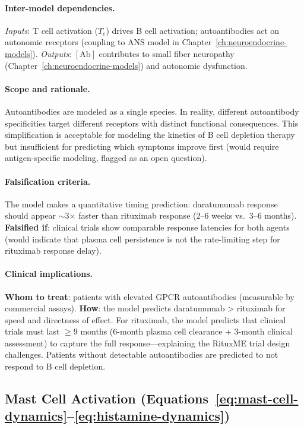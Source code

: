 \paragraph{Inter-model dependencies.}
\emph{Inputs}: T cell activation ($T_e$) drives B cell activation; autoantibodies act on autonomic receptors (coupling to ANS model in Chapter~\ref{ch:neuroendocrine-models}). \emph{Outputs}: $[\text{Ab}]$ contributes to small fiber neuropathy (Chapter~\ref{ch:neuroendocrine-models}) and autonomic dysfunction.

\paragraph{Scope and rationale.}
Autoantibodies are modeled as a single species. In reality, different autoantibody specificities target different receptors with distinct functional consequences. This simplification is acceptable for modeling the kinetics of B cell depletion therapy but insufficient for predicting which symptoms improve first (would require antigen-specific modeling, flagged as an open question).

\paragraph{Falsification criteria.}
The model makes a quantitative timing prediction: daratumumab response should appear $\sim$3$\times$ faster than rituximab response (2--6 weeks vs.\ 3--6 months). \textbf{Falsified if}: clinical trials show comparable response latencies for both agents (would indicate that plasma cell persistence is not the rate-limiting step for rituximab response delay).

\paragraph{Clinical implications.}
\textbf{Whom to treat}: patients with elevated GPCR autoantibodies (measurable by commercial assays). \textbf{How}: the model predicts daratumumab > rituximab for speed and directness of effect. For rituximab, the model predicts that clinical trials must last $\geq$9 months (6-month plasma cell clearance + 3-month clinical assessment) to capture the full response---explaining the RituxME trial design challenges. Patients without detectable autoantibodies are predicted to not respond to B cell depletion.

\subsection{Mast Cell Activation (Equations~\ref{eq:mast-cell-dynamics}--\ref{eq:histamine-dynamics})}

